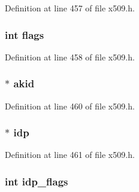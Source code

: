 Definition at line 457 of file x509.\+h.

\subsubsection[{\texorpdfstring{flags}{flags}}]{\setlength{\rightskip}{0pt plus 5cm}int flags}\hypertarget{struct_x509__crl__st_ac8bf36fe0577cba66bccda3a6f7e80a4}{}\label{struct_x509__crl__st_ac8bf36fe0577cba66bccda3a6f7e80a4}


Definition at line 458 of file x509.\+h.

\subsubsection[{\texorpdfstring{akid}{akid}}]{ $\ast$ akid}\hypertarget{struct_x509__crl__st_a08ed0324382dcedeff14b415417cd511}{}\label{struct_x509__crl__st_a08ed0324382dcedeff14b415417cd511}


Definition at line 460 of file x509.\+h.

\subsubsection[{\texorpdfstring{idp}{idp}}]{ $\ast$ idp}\hypertarget{struct_x509__crl__st_a26aba55480dcadba46946dd771292316}{}\label{struct_x509__crl__st_a26aba55480dcadba46946dd771292316}


Definition at line 461 of file x509.\+h.

\subsubsection[{\texorpdfstring{idp\+\_\+flags}{idp_flags}}]{\setlength{\rightskip}{0pt plus 5cm}int idp\+\_\+flags}\hypertarget{struct_x509__crl__st_af51a11c5cb7464597c4c2db0690b989c}{}\label{struct_x509__crl__st_af51a11c5cb7464597c4c2db0690b989c}


